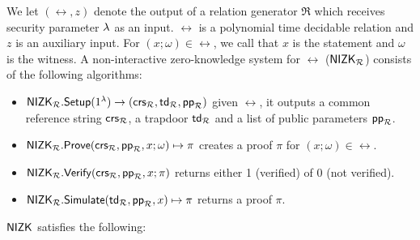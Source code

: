 
% 

We let $ (\rel, z) $ denote the output of a relation generator $ \mathfrak{R} $ which receives security parameter $ \lambda $ as an input. $ \rel $ is a polynomial time decidable relation and $ z $ is an auxiliary input. For $ (x; \omega) \in \rel $, we call that $x$ is the statement and $ \omega $ is the witness.
A non-interactive zero-knowledge system for $\rel$ ($ {\mathsf{NIZK}}_\mathcal{R} $)  consists of the following algorithms:
\begin{itemize}
	\item ${\mathsf{NIZK}}_\mathcal{R}.{\mathsf{Setup}}(1^{\lambda}) \rightarrow (\mathsf{crs}_\mathcal{R}, \mathsf{td}_\mathcal{R}, \mathsf{pp}_\mathcal{R})$  given $ \rel $, it outputs a common reference string $ \mathsf{crs}_\mathcal{R} $, a trapdoor $ \mathsf{td}_\mathcal{R} $ and a list of public parameters $\mathsf{pp}_\mathcal{R}$. 
	\item ${\mathsf{NIZK}}_\mathcal{R}.{\mathsf{Prove}}(\mathsf{crs}_\mathcal{R}, \mathsf{pp}_\mathcal{R}, x; \omega) \mapsto \pi$ creates a proof $\pi$ for  $(x; \omega) \in \rel$. 
	\item ${\mathsf{NIZK}}_\mathcal{R}.{\mathsf{Verify}}(\mathsf{crs}_\mathcal{R}, \mathsf{pp}_\mathcal{R}, x; \pi)$ returns either 1 (verified) of 0 (not verified).
	\item $ {\mathsf{NIZK}}_\mathcal{R}.{\mathsf{Simulate}}(\mathsf{td}_\mathcal{R}, \mathsf{pp}_\mathcal{R}, x) \mapsto \pi$ returns a proof $ \pi $.
\end{itemize}	
$ {\mathsf{NIZK}} $ satisfies the following:


